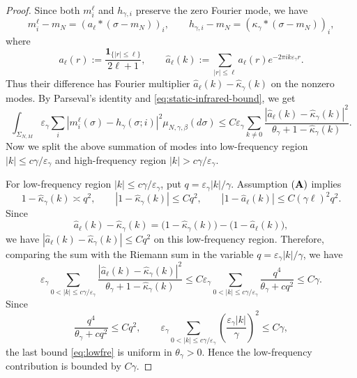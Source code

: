 \documentclass{article}
\begin{document}
\begin{proof}
Since both \(m_i^\ell\) and \(h_{\gamma,i}\) preserve the zero Fourier mode, we have
\[
m_i^\ell-m_N=(a_\ell*(\sigma-m_N))_i,
\qquad
h_{\gamma,i}-m_N=(\kappa_\gamma*(\sigma-m_N))_i,
\]
where
\[
a_\ell(r):=\frac{\mathbf 1_{\{|r|\le \ell\}}}{2\ell+1},
\qquad
\widehat a_\ell(k)
:=
\sum_{|r|\le\ell}a_\ell(r)e^{-2\pi i k\varepsilon_\gamma r}.
\]
Thus their difference has Fourier multiplier \(\widehat a_\ell(k)-\widehat\kappa_\gamma(k)\) on the nonzero modes.  
By Parseval's identity and \eqref{eq:static-infrared-bound}, we get
\begin{equation}\label{eq:block-to-kac-fourier-bound-main}
    \int_{\Sigma_{N,M}}
\varepsilon_\gamma\sum_i \left|  m_i^\ell(\sigma)-h_\gamma(\sigma;i) \right|^2 \mu_{N,\gamma,\beta}(d\sigma) \le
C\varepsilon_\gamma
\sum_{k\ne0} \frac{\left|\widehat a_\ell(k)-\widehat\kappa_\gamma(k)\right|^2}{\theta_\gamma+1-\widehat\kappa_\gamma(k)}.
\end{equation}
Now we split the above summation of modes into low-frequency region \(|k|\le c\gamma/\varepsilon_\gamma\) and high-frequency region \(|k| > c\gamma/\varepsilon_\gamma\).  

For low-frequency region \(|k|\le c\gamma/\varepsilon_\gamma\), put
\(q=\varepsilon_\gamma|k|/\gamma\).  Assumption \(({\bf A})\) implies
\[
1-\widehat\kappa_\gamma(k)\asymp q^2,
\qquad
|1-\widehat\kappa_\gamma(k)|\le Cq^2,
\qquad
|1-\widehat a_\ell(k)|\le C(\gamma\ell)^2q^2.
\]
Since
\[
\widehat a_\ell(k)-\widehat\kappa_\gamma(k)
=
\bigl(1-\widehat\kappa_\gamma(k)\bigr)
-
\bigl(1-\widehat a_\ell(k)\bigr),
\]
we have $\left|\widehat a_\ell(k)-\widehat\kappa_\gamma(k)\right| \le Cq^2$ on this low-frequency region.  
Therefore, comparing the sum with the Riemann sum in the variable \(q=\varepsilon_\gamma |k|/\gamma\), we have
\begin{equation}\label{eq:lowfre}
    \varepsilon_\gamma
\sum_{0<|k|\le c\gamma/\varepsilon_\gamma}
\frac{\left|\widehat a_\ell(k)-\widehat\kappa_\gamma(k)\right|^2}{\theta_\gamma+1-\widehat\kappa_\gamma(k)}
\le
C\varepsilon_\gamma
\sum_{0<|k|\le c\gamma/\varepsilon_\gamma}
\frac{q^4}{\theta_\gamma+cq^2}
\le C\gamma.
\end{equation}
Since
\[
\frac{q^4}{\theta_\gamma+cq^2}\le Cq^2,
\qquad
\varepsilon_\gamma
\sum_{0<|k|\le c\gamma/\varepsilon_\gamma}
\left(\frac{\varepsilon_\gamma |k|}{\gamma}\right)^2
\le C\gamma,
\]
the last bound \eqref{eq:lowfre} is uniform in \(\theta_\gamma>0\).
Hence the low-frequency contribution is bounded by \(C\gamma\).  


\end{proof}
\end{document}
